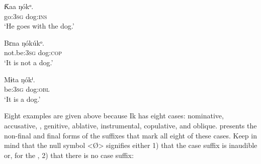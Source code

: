  
\ea\label{ex:case:6}
\gll Ƙaa     ŋókᵒ. \\ 
go:\textsc{3sg}  dog:\textsc{ins}    \\
\glt ‘He goes with the dog.’ 
\z



 
\ea\label{ex:case:7}
\gll Bɛna     ŋókúkᵒ. \\ 
not.be:\textsc{3sg}  dog:\textsc{cop}    \\
\glt ‘It is not a dog.’ 
\z



 
\ea\label{ex:case:8}
\gll Mɨta     ŋókⁱ. \\ 
be:\textsc{3sg}  dog:\textsc{obl}    \\
\glt ‘It is a dog.’ 
\z


Eight examples are given above because Ik has eight cases: nominative, accusative, , genitive, ablative, instrumental, copulative, and oblique.  presents the non-final and final forms of the suffixes that mark all eight of these cases. Keep in mind that the null symbol <Ø> signifies either 1) that the case suffix is inaudible or, for the , 2) that there is no case suffix:


